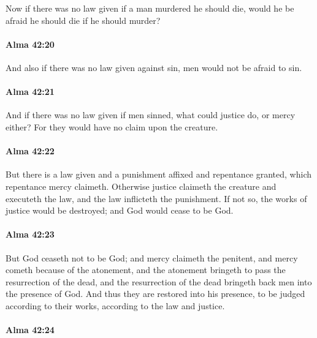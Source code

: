 			Now if there was no law given if a man murdered he should die,
			would he be afraid he should die if he should murder?

		\paragraph{Alma 42:20} %
			\label{ALMA-42-20}

			And also if there was no law given against sin,
			men would not be afraid to sin.

		\paragraph{Alma 42:21} %
			\label{ALMA-42-21}

			And if there was no law given if men sinned,
			what could justice do, or mercy either?
			For they would have no claim upon the creature.

		\paragraph{Alma 42:22} %
			\label{ALMA-42-22}

			But there is a law given and a punishment affixed and repentance granted,
			which repentance mercy claimeth.
			Otherwise justice claimeth the creature and executeth the law,
			and the law inflicteth the punishment.
			If not so, the works of justice would be destroyed;
			and God would cease to be God.

		\paragraph{Alma 42:23} %
			\label{ALMA-42-23}

			But God ceaseth not to be God;
			and mercy claimeth the penitent,
			and mercy cometh because of the atonement,
			and the atonement bringeth to pass the resurrection of the dead,
			and the resurrection of the dead bringeth back men into the presence of God.
			And thus they are restored into his presence,
			to be judged according to their works, according to the law and justice.

		\paragraph{Alma 42:24} %
			\label{ALMA-42-24}


